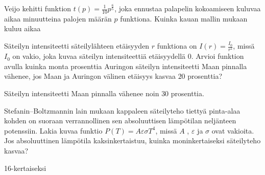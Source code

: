\begin{tehtavasivu}
\begin{tehtava}
Veijo kehitti funktion $t(p)=\frac{1}{10}p^{\frac{6}{5}}$, joka ennustaa palapelin kokoamiseen kuluvaa aikaa minuutteina palojen 
määrän $p$ funktiona. Kuinka kauan mallin mukaan kuluu aikaa
\begin{vastaus}
\end{vastaus}
\end{tehtava}


\begin{tehtava}
Säteilyn intensiteetti säteilylähteen etäisyyden $r$ funktiona on $ I(r)=\frac{I_0}{r^{2}}$, missä $I_0$ on vakio, joka kuvaa säteilyn intensiteettiä etäisyydellä $0$. Arvioi funktion avulla kuinka monta prosenttia Auringon säteilyn intensiteetti Maan pinnalla vähenee, jos Maan ja Auringon välinen etäisyys kasvaa $20$ prosenttia?
\begin{vastaus}
Säteilyn intensiteetti Maan pinnalla vähenee noin $30$ prosenttia.
\end{vastaus}
\end{tehtava}

\begin{tehtava}
Stefanin--Boltzmannin lain mukaan kappaleen säteilyteho tiettyä pinta-alaa kohden on suoraan verrannollinen sen absoluuttisen lämpötilan neljänteen potenssiin. Lakia kuvaa funktio $ P(T)=A\varepsilon\sigma T^4 $, missä $A$ , $\varepsilon$ ja $\sigma $ ovat vakioita. Jos absoluuttinen lämpötila kaksinkertaistuu, kuinka moninkertaiseksi säteilyteho kasvaa?%
\begin{vastaus}
16-kertaiseksi
\end{vastaus}
\end{tehtava}

\end{tehtavasivu}
